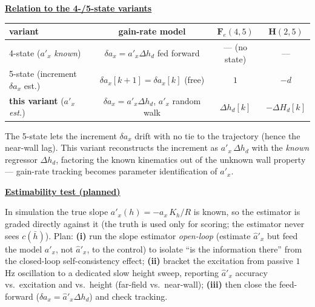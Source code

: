 \documentclass[11pt,a4paper]{ctexart}
\newcommand{\hd}[1]{\par\medskip\noindent\underline{\textbf{#1}}\par\nobreak\vspace{0.2ex}}
\begin{document}
\hd{Relation to the 4-/5-state variants}
\begin{center}\small
\begin{tabular}{@{}lccc@{}}
\toprule
variant & gain-rate model & $\mathbf{F}_e(4,5)$ & $\mathbf{H}(2,5)$ \\
\midrule
4-state ($a'_x$ \textit{known}) & $\delta a_x=a'_x\Delta h_d$ fed forward & --- (no state) & --- \\
5-state (increment $\delta a_x$ est.) & $\delta a_x[k{+}1]=\delta a_x[k]$ (free) & $1$ & $-d$ \\
\textbf{this variant} ($a'_x$ \textit{est.}) & $\delta a_x=a'_x\Delta h_d$, $a'_x$ random walk & $\Delta h_d[k]$ & $-\Delta H_d[k]$ \\
\bottomrule
\end{tabular}
\end{center}
The 5-state lets the increment $\delta a_x$ drift with no tie to the trajectory (hence the near-wall lag). This variant reconstructs the increment as $a'_x\,\Delta h_d$ with the \textit{known} regressor $\Delta h_d$, factoring the known kinematics out of the unknown wall property --- gain-rate tracking becomes parameter identification of $a'_x$.

\hd{Estimability test (planned)}
In simulation the true slope $a'_x(h)=-a_x\,K_h/R$ is known, so the estimator is graded directly against it (the truth is used only for scoring; the estimator never sees $c(\bar h)$). Plan: \textbf{(i)} run the slope estimator \textit{open-loop} (estimate $\hat a'_x$ but feed the model $a'_x$, not $\hat a'_x$, to the control) to isolate ``is the information there'' from the closed-loop self-consistency effect; \textbf{(ii)} bracket the excitation from passive $1\,$Hz oscillation to a dedicated slow height sweep, reporting $\hat a'_x$ accuracy vs.\ excitation and vs.\ height (far-field vs.\ near-wall); \textbf{(iii)} then close the feed-forward ($\delta a_x=\hat a'_x\Delta h_d$) and check tracking.
\end{document}
